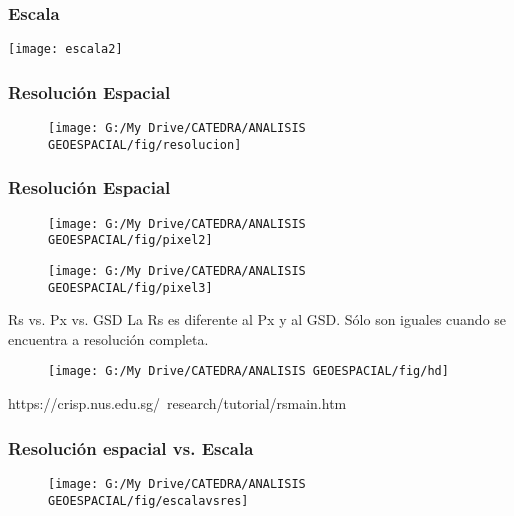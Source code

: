 \documentclass{beamer}
\begin{document}
\begin{frame}
\frametitle{Escala}
\begin{center}
   	\texttt{[image: escala2]}
\end{center}
\end{frame}
\begin{frame}
\frametitle{Resolución Espacial}
 \begin{figure}
    \centering
    \texttt{[image: G:/My Drive/CATEDRA/ANALISIS GEOESPACIAL/fig/resolucion]}
  \end{figure}
\end{frame}
\begin{frame}
\frametitle{Resolución Espacial}
 \begin{figure}
    \centering
    \texttt{[image: G:/My Drive/CATEDRA/ANALISIS GEOESPACIAL/fig/pixel2]}
  \end{figure}
\end{frame}
\begin{frame}
 \begin{figure}
    \centering
    \texttt{[image: G:/My Drive/CATEDRA/ANALISIS GEOESPACIAL/fig/pixel3]}
  \end{figure}
\end{frame}
\begin{frame}
\begin{exampleblock}{Rs vs. Px vs. GSD}
\small{La Rs es diferente al Px y al GSD. Sólo son iguales cuando se encuentra a resolución completa.}
\end{exampleblock}
 \begin{figure}
    \centering
    \texttt{[image: G:/My Drive/CATEDRA/ANALISIS GEOESPACIAL/fig/hd]}
  \end{figure}
\tiny{https://crisp.nus.edu.sg/~research/tutorial/rsmain.htm}
\end{frame}
\begin{frame}
\frametitle{Resolución espacial vs. Escala}
 \begin{figure}
    \centering
    \texttt{[image: G:/My Drive/CATEDRA/ANALISIS GEOESPACIAL/fig/escalavsres]}
  \end{figure}
\end{frame}
\end{document}
